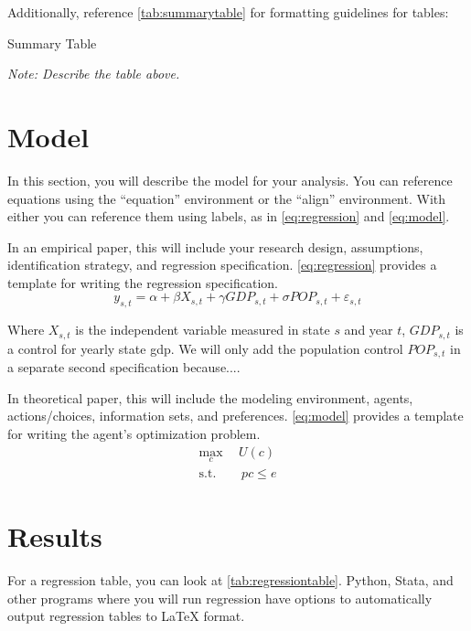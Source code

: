 \documentclass[12pt]{article}
\begin{document}
Additionally, reference \autoref{tab:summarytable} for formatting guidelines for tables:

\begin{table}[ht]
    \centering
    \caption{Summary Table}
    \label{tab:summarytable}
    
    \caption*{\footnotesize \textit{Note: Describe the table above.}}
\end{table}



\section{Model}
In this section, you will describe the model for your analysis. You can reference equations using the ``equation'' environment or the ``align'' environment. With either you can reference them using labels, as in \autoref{eq:regression} and \autoref{eq:model}.

 In an empirical paper, this will include your research design, assumptions, identification strategy, and regression specification. \autoref{eq:regression} provides a template for writing the regression specification.
\begin{equation}\label{eq:regression}
    y_{s,t} = \alpha +\beta X_{s,t} + \gamma GDP_{s,t} + \sigma POP_{s,t} +\varepsilon_{s,t}
\end{equation}

Where \(X_{s,t}\) is the independent variable measured in state \(s\) and year \(t\), \(GDP_{s,t}\) is a control for yearly state gdp. We will only add the population control \(POP_{s,t}\) in a separate second specification because....

 In theoretical paper, this will include the modeling environment, agents, actions/choices, information sets, and preferences. \autoref{eq:model} provides a template for writing the agent's optimization problem.
\begin{align}\label{eq:model}
    \max_c\ &\ U(c) \\
    \text{s.t.} &\ \ p c \leq e  \nonumber 
\end{align}


\section{Results}

For a regression table, you can look at \autoref{tab:regressiontable}. Python, Stata, and other programs where you will run regression have options to automatically output regression tables to LaTeX format. 
\end{document}
